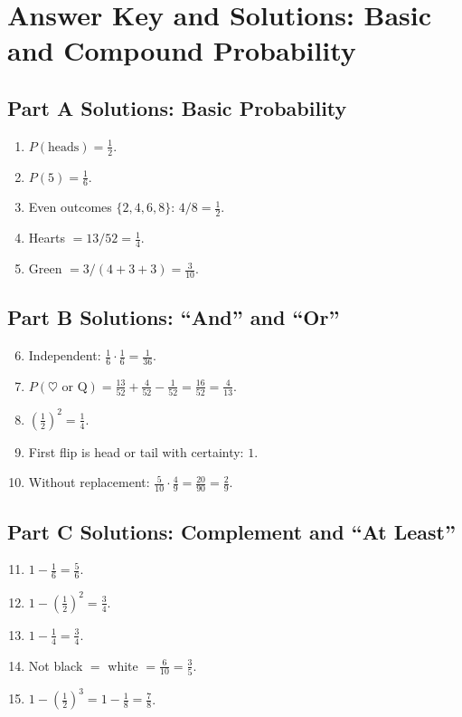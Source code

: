 \documentclass[14pt]{extarticle}
\begin{document}
\newpage


\section*{Answer Key and Solutions: Basic and Compound Probability}

\subsection*{Part A Solutions: Basic Probability}
\begin{enumerate}
  \item \(P(\text{heads})=\tfrac{1}{2}\).
  \item \(P(5)=\tfrac{1}{6}\).
  \item Even outcomes \(\{2,4,6,8\}\): \(4/8=\tfrac{1}{2}\).
  \item Hearts \(=13/52=\tfrac{1}{4}\).
  \item Green \(=3/(4+3+3)=\tfrac{3}{10}\).
\end{enumerate}

\subsection*{Part B Solutions: “And” and “Or”}
\begin{enumerate}
  \setcounter{enumi}{5}
  \item Independent: \(\tfrac{1}{6}\cdot\tfrac{1}{6}=\tfrac{1}{36}\).
  \item \(P(\heartsuit \text{ or Q})=\tfrac{13}{52}+\tfrac{4}{52}-\tfrac{1}{52}=\tfrac{16}{52}=\tfrac{4}{13}\).
  \item \((\tfrac{1}{2})^2=\tfrac{1}{4}\).
  \item First flip is head or tail with certainty: \(1\).
  \item Without replacement: \(\tfrac{5}{10}\cdot\tfrac{4}{9}=\tfrac{20}{90}=\tfrac{2}{9}\).
\end{enumerate}

\subsection*{Part C Solutions: Complement and “At Least”}
\begin{enumerate}
  \setcounter{enumi}{10}
  \item \(1-\tfrac{1}{6}=\tfrac{5}{6}\).
  \item \(1-(\tfrac{1}{2})^2=\tfrac{3}{4}\).
  \item \(1-\tfrac{1}{4}=\tfrac{3}{4}\).
  \item Not black \(=\) white \(= \tfrac{6}{10}=\tfrac{3}{5}\).
  \item \(1-(\tfrac{1}{2})^3=1-\tfrac{1}{8}=\tfrac{7}{8}\).
\end{enumerate}
\end{document}
